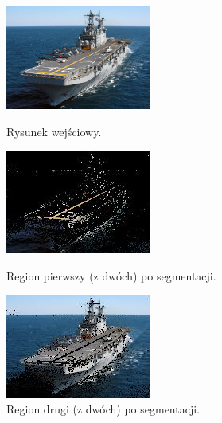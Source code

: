 \documentclass[10pt]{llncs}
\begin{document}
\begin{figure}[!htb]
  \includegraphics[width=\linewidth]{img/ship.jpg}
  \caption{Rysunek wejściowy.}\label{fig:13}
\endminipage\hfill
{}
  \includegraphics[width=\linewidth]{img/ship_k2_0.jpg}
  \caption{Region pierwszy (z dwóch) po segmentacji.}\label{fig:14}
\endminipage\hfill
{}
  \includegraphics[width=\linewidth]{img/ship_k2_1.jpg}
  \caption{Region drugi (z dwóch) po segmentacji.}\label{fig:15}
\endminipage
\end{figure}
\end{document}
